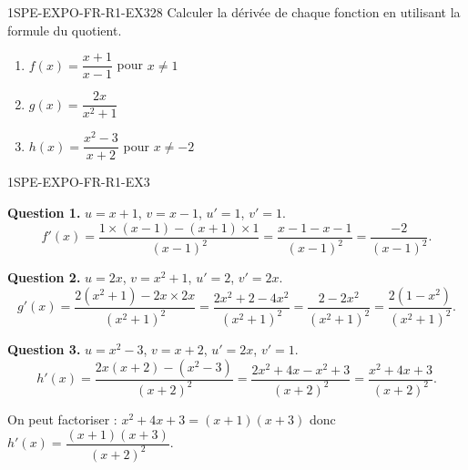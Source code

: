 
\begin{exercice}{1SPE-EXPO-FR-R1-EX3}{2}{8}
Calculer la dérivée de chaque fonction en utilisant la formule du quotient.
\begin{enumerate}
  \item $f(x) = \dfrac{x+1}{x-1}$ \quad pour $x
\neq 1$
  \item $g(x) = \dfrac{2x}{x^2+1}$
  \item $h(x) = \dfrac{x^2 - 3}{x + 2}$ \quad pour $x
\neq -2$
\end{enumerate}
\end{exercice}



\begin{corrige}{1SPE-EXPO-FR-R1-EX3}


\textbf{Question 1.} $u = x+1$, $v = x-1$, $u' = 1$, $v' = 1$.
\[
f'(x) = \frac{1 \times (x-1) - (x+1) \times 1}{(x-1)^2} = \frac{x - 1 - x - 1}{(x-1)^2} = \frac{-2}{(x-1)^2}.
\]

\textbf{Question 2.} $u = 2x$, $v = x^2+1$, $u' = 2$, $v' = 2x$.
\[
g'(x) = \frac{2(x^2+1) - 2x \times 2x}{(x^2+1)^2} = \frac{2x^2 + 2 - 4x^2}{(x^2+1)^2} = \frac{2 - 2x^2}{(x^2+1)^2} = \frac{2(1-x^2)}{(x^2+1)^2}.
\]

\textbf{Question 3.} $u = x^2-3$, $v = x+2$, $u' = 2x$, $v' = 1$.
\[
h'(x) = \frac{2x(x+2) - (x^2-3)}{(x+2)^2} = \frac{2x^2 + 4x - x^2 + 3}{(x+2)^2} = \frac{x^2 + 4x + 3}{(x+2)^2}.
\]

On peut factoriser : $x^2 + 4x + 3 = (x+1)(x+3)$ donc $h'(x) = \dfrac{(x+1)(x+3)}{(x+2)^2}$.

\end{corrige}
